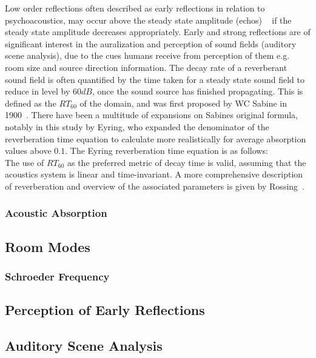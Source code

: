 Low order reflections often described as early reflections in relation to psychoacoustics, may occur above the steady state amplitude (echos) ~\cite{Everest2009} if the steady state amplitude decreases appropriately. Early and strong reflections are of significant interest in the auralization and perception of sound fields (auditory scene analysis), due to the cues humans receive from perception of them e.g. room size and source direction information. The decay rate of a reverberant sound field is often quantified by the time taken for a steady state sound field to reduce in level by $60{dB}$, once the sound source has finished propagating. This is defined as the $RT_{60}$ of the domain, and was first proposed by WC Sabine in 1900~\cite{Everest2009}. There have been a multitude of expansions on Sabines original formula, notably in this study by Eyring, who expanded the denominator of the reverberation time equation to calculate more realistically for average absorption values above $0.1$. The Eyring reverberation time equation is as follows:\\



The use of $RT_{60}$ as the preferred metric of decay time is valid, assuming that the acoustics system is linear and time-invariant.
A more comprehensive description of reverberation and overview of the associated parameters is given by Rossing~\cite{rossing2007springer}. 


\subsubsection{Acoustic Absorption}

\subsection{Room Modes}

\subsubsection{Schroeder Frequency}

\subsection{Perception of Early Reflections}

\subsection{Auditory Scene Analysis}


